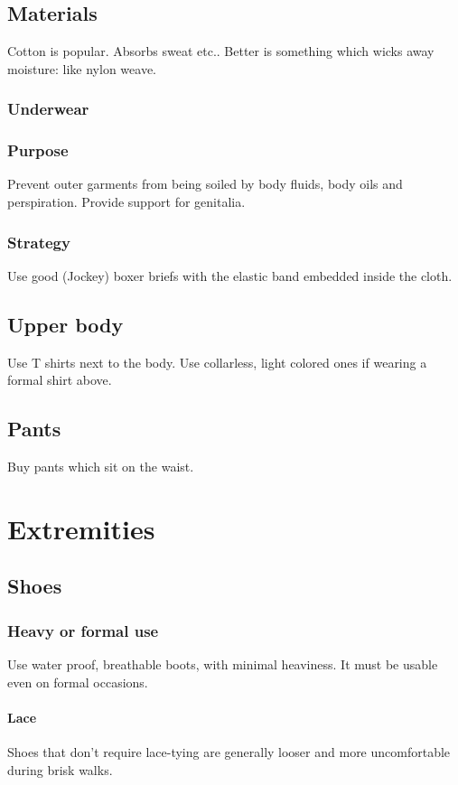 \documentclass[oneside, article]{memoir}
\begin{document}
\section{Materials}
Cotton is popular. Absorbs sweat etc.. Better is something which wicks away moisture: like nylon weave.

\subsection{Underwear}
\subsection{Purpose}
Prevent outer garments from being soiled by body fluids, body oils and perspiration. Provide support for genitalia.

\subsection{Strategy}
Use good (Jockey) boxer briefs with the elastic band embedded inside the cloth.

\section{Upper body}
Use T shirts next to the body. Use collarless, light colored ones if wearing a formal shirt above.

\section{Pants}
Buy pants which sit on the waist.

\chapter{Extremities}
\section{Shoes}
\subsection{Heavy or formal use}
Use water proof, breathable boots, with minimal heaviness. It must be usable even on formal occasions.

\subsubsection{Lace}
Shoes that don't require lace-tying are generally looser and more uncomfortable during brisk walks.
\end{document}

